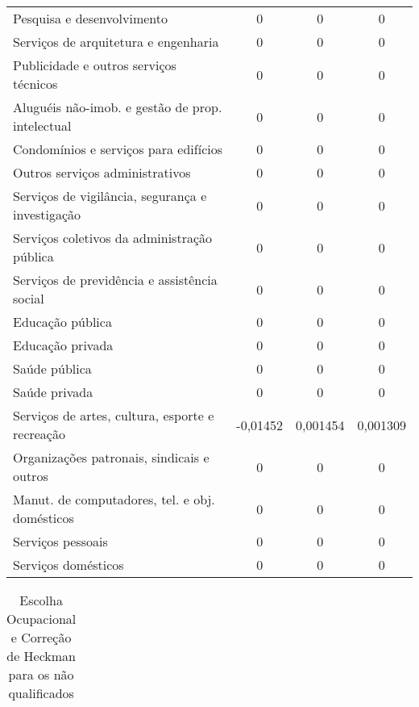 \begin{apendicesenv}
\begin{small}
\begin{center}
\begin{longtable}{m{8cm}ccc}
				Pesquisa e desenvolvimento                         & 0 & 0 & 0 \\
				Serviços de arquitetura e engenharia               & 0 & 0 & 0 \\
				Publicidade e outros serviços técnicos             & 0 & 0 & 0 \\
				Aluguéis não-imob. e gestão de prop. intelectual   & 0 & 0 & 0 \\
				Condomínios e serviços para edifícios              & 0 & 0 & 0 \\
				Outros serviços administrativos                    & 0 & 0 & 0 \\
				Serviços de vigilância, segurança e investigação   & 0 & 0 & 0 \\
				Serviços coletivos da administração pública        & 0 & 0 & 0 \\
				Serviços de previdência e assistência social       & 0 & 0 & 0 \\
				Educação pública                                   & 0 & 0 & 0 \\
				Educação privada                                   & 0 & 0 & 0 \\
				Saúde pública                                      & 0 & 0 & 0 \\
				Saúde privada                                      & 0 & 0 & 0 \\
				Serviços de artes, cultura, esporte e recreação    & -0,01452 & 0,001454 & 0,001309 \\
				Organizações patronais, sindicais e outros         & 0 & 0 & 0 \\
				Manut. de computadores, tel. e obj. domésticos     & 0 & 0 & 0 \\
				Serviços pessoais                                  & 0 & 0 & 0 \\
				Serviços domésticos                                & 0 & 0 & 0 \\ \hline
			\end{longtable}
		\end{center}
	\end{small}

	\newpage

	  \begin{longtable}{@{\extracolsep{5pt}}lD{.}{.}{-3} D{.}{.}{-3} D{.}{.}{-3} }
		\caption{Escolha Ocupacional e Correção de Heckman para os não qualificados}


\end{longtable}
\end{apendicesenv}
